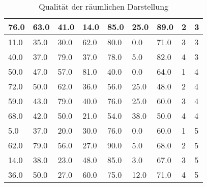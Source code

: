 \begin{table}[!ht]
{\begin{tabular}{|l|l|l|l|l|l|l|l|l|}
76.0                          & 63.0               & 41.0                   & 14.0                        & 85.0           & 25.0             & 89.0                   & 2              & 3                    \\ \hline
11.0                          & 35.0               & 30.0                   & 62.0                        & 80.0           & 0.0              & 71.0                   & 3              & 3                    \\ \hline
40.0                          & 37.0               & 79.0                   & 37.0                        & 78.0           & 5.0              & 82.0                   & 4              & 3                    \\ \hline
50.0                          & 47.0               & 57.0                   & 81.0                        & 40.0           & 0.0              & 64.0                   & 1              & 4                    \\ \hline
72.0                          & 50.0               & 62.0                   & 36.0                        & 56.0           & 25.0             & 48.0                   & 2              & 4                    \\ \hline
59.0                          & 43.0               & 79.0                   & 40.0                        & 76.0           & 25.0             & 60.0                   & 3              & 4                    \\ \hline
68.0                          & 42.0               & 50.0                   & 21.0                        & 54.0           & 38.0             & 50.0                   & 4              & 4                    \\ \hline
5.0                           & 37.0               & 20.0                   & 30.0                        & 76.0           & 0.0              & 60.0                   & 1              & 5                    \\ \hline
62.0                          & 79.0               & 56.0                   & 27.0                        & 90.0           & 5.0              & 68.0                   & 2              & 5                    \\ \hline
14.0                          & 38.0               & 23.0                   & 48.0                        & 85.0           & 3.0              & 67.0                   & 3              & 5                    \\ \hline
36.0                          & 50.0               & 27.0                   & 60.0                        & 75.0           & 12.0             & 71.0                   & 4              & 5                    \\ \hline
\end{tabular}%
}
\caption {Qualität der räumlichen Darstellung}
\end{table}
